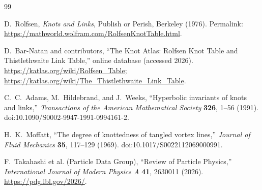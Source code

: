 \begin{thebibliography}{99}

D.~Rolfsen,
\emph{Knots and Links},
Publish or Perish, Berkeley (1976).
Permalink: \url{https://mathworld.wolfram.com/RolfsenKnotTable.html}.

D.~Bar-Natan and contributors,
``The Knot Atlas: Rolfsen Knot Table and Thistlethwaite Link Table,''
online database (accessed 2026).
\url{https://katlas.org/wiki/Rolfsen_Table};
\url{https://katlas.org/wiki/The_Thistlethwaite_Link_Table}.

C.~C.~Adams, M.~Hildebrand, and J.~Weeks,
``Hyperbolic invariants of knots and links,''
\emph{Transactions of the American Mathematical Society}
\textbf{326}, 1--56 (1991).
doi:10.1090/S0002-9947-1991-0994161-2.

H.~K.~Moffatt,
``The degree of knottedness of tangled vortex lines,''
\emph{Journal of Fluid Mechanics} \textbf{35}, 117--129 (1969).
doi:10.1017/S0022112069000991.

F.~Takahashi et al. (Particle Data Group),
``Review of Particle Physics,''
\emph{International Journal of Modern Physics A} \textbf{41}, 2630011 (2026).
\url{https://pdg.lbl.gov/2026/}.

\end{thebibliography}

